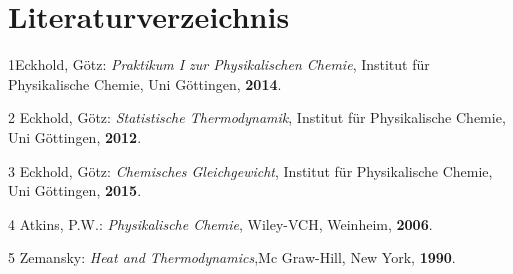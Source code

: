 \documentclass[a4paper,12pt,oneside,onecolum,final,openany]{report}
\begin{document}
\chapter{Literaturverzeichnis}
1\quad Eckhold, Götz: \emph{Praktikum I zur Physikalischen Chemie}, Institut für Physikalische Chemie, Uni Göttingen, \textbf{2014}.

\vspace{0,5 cm}

2 \quad Eckhold, Götz: \emph{Statistische Thermodynamik}, Institut für Physikalische Chemie, Uni Göttingen, \textbf{2012}.

\vspace{0,5cm}

3 \quad Eckhold, Götz: \emph{Chemisches Gleichgewicht}, Institut für Physikalische Chemie, Uni Göttingen, \textbf{2015}.\\

\vspace{0,5cm}

4 \quad Atkins, P.W.: \emph{Physikalische Chemie}, Wiley-VCH, Weinheim, \textbf{2006}.\\

\vspace{0,5cm}

5 \quad Zemansky: \emph{Heat and Thermodynamics},Mc Graw-Hill, New York, \textbf{1990}.\\
\end{document}
